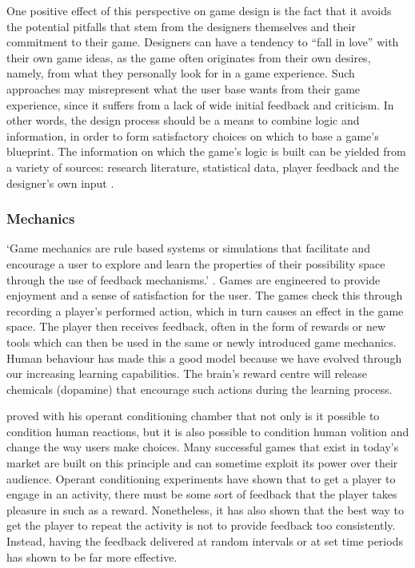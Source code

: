 \documentclass[final]{cmpreport}
\begin{document}
One positive effect of this perspective on game design is the fact that it avoids the potential pitfalls that stem from the designers themselves and their commitment to their game. Designers can have a tendency to ``fall in love'' with their own game ideas, as the game often originates from their own desires, namely, from what they personally look for in a game experience. Such approaches may misrepresent what the user base wants from their game experience, since it suffers from a lack of wide initial feedback and criticism. In other words, the design process should be a means to combine logic and information, in order to form satisfactory choices on which to base a game's blueprint. The information on which the game's logic is built can be yielded from a variety of sources: research literature, statistical data, player feedback and the designer's own input \citep{ErmiMayra}.

\subsubsection{Mechanics}
`Game mechanics are rule based systems or simulations that facilitate and encourage a user to explore and learn the properties of their possibility space through the use of feedback mechanisms.' \citep{Koster}. Games are engineered to provide enjoyment and a sense of satisfaction for the user. The games check this through recording a player's performed action, which in turn causes an effect in the game space. The player then receives feedback, often in the form of rewards or new tools which can then be used in the same or newly introduced game mechanics. Human behaviour has made this a good model because we have evolved through our increasing learning capabilities. The brain's reward centre will release chemicals (dopamine) that encourage such actions during the learning process.

\citet{Skinner} proved with his operant conditioning chamber that not only is it possible to condition human reactions, but it is also possible to condition human volition and change the way users make choices. Many successful games that exist in today's market are built on this principle and can sometime exploit its power over their audience. Operant conditioning experiments have shown that to get a player to engage in an activity, there must be some sort of feedback that the player takes pleasure in such as a reward. Nonetheless, it has also shown that the best way to get the player to repeat the activity is not to provide feedback too consistently. Instead, having the feedback delivered at random intervals or at set time periods has shown to be far more effective.
\end{document}
